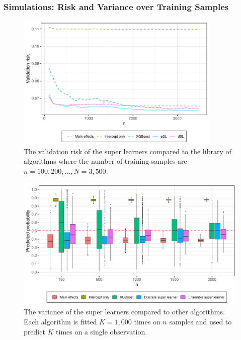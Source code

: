 \documentclass{beamer}
\begin{document}
\begin{frame}
    \frametitle{Simulations: Risk and Variance over Training Samples} 
    \begin{figure}[H]
        \centering
        \includegraphics[width=0.87\textwidth]{figures/losses_esl_s22.pdf}
        \caption{The validation risk of the super learners compared to the library of algorithms where the number of training samples are $n = 100, 200, \dots , N = 3,500 $.}
        \label{fig:losses_esl_s22}
    \end{figure}
\end{frame}

\begin{frame}
\begin{figure}[H]
    \centering
    \includegraphics[width=\textwidth]{figures/learner_vars_w_esl_1000.pdf}
    \caption{The variance of the super learners compared to other algorithms. Each algorithm is fitted $ K = 1,000 $ times on $n$ samples and used to predict $ K $ times on a single observation.}
    \label{fig:learner_vars_w_esl_1000}
\end{figure}
\end{frame}
\end{document}

